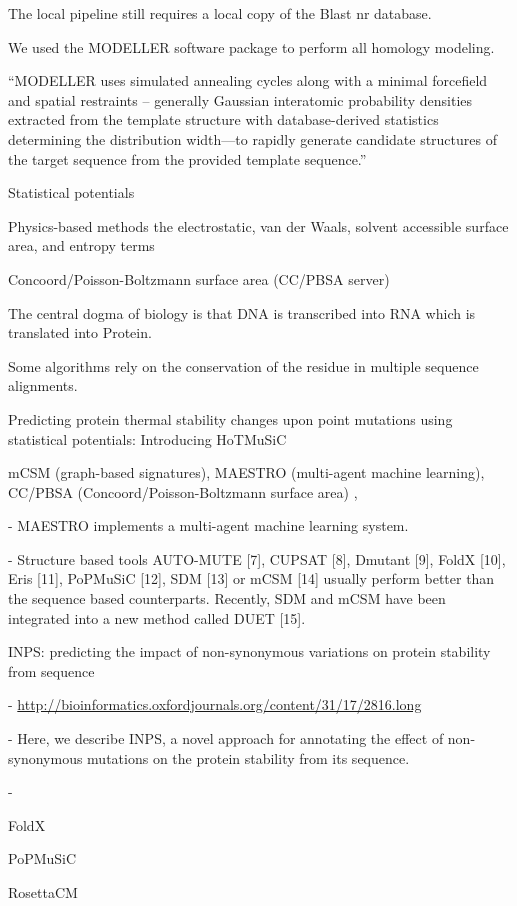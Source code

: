 The local pipeline still requires a local copy of the Blast nr database.

We used the MODELLER software package to perform all homology modeling.

``MODELLER uses simulated annealing cycles along with a minimal forcefield and spatial restraints -- generally Gaussian interatomic probability densities extracted from the template structure with database-derived statistics determining the distribution width—to rapidly generate candidate structures of the target sequence from the provided template sequence.''


Statistical potentials

Physics-based methods
the electrostatic, van der Waals, solvent accessible surface area, and entropy terms

Concoord/Poisson-Boltzmann surface area (CC/PBSA server)

The central dogma of biology is that DNA is transcribed into RNA which is translated into Protein.


Some algorithms rely on the conservation of the residue in multiple sequence alignments.

Predicting protein thermal stability changes upon point mutations using statistical potentials: Introducing HoTMuSiC


mCSM  (graph-based signatures), MAESTRO  (multi-agent machine learning), CC/PBSA (Concoord/Poisson-Boltzmann surface area) ,

  - MAESTRO implements a multi-agent machine learning system.

  - Structure based tools AUTO-MUTE [7], CUPSAT [8], Dmutant [9], FoldX [10], Eris [11], PoPMuSiC [12], SDM [13] or mCSM [14] usually perform better than the sequence based counterparts. Recently, SDM and mCSM have been integrated into a new method called DUET [15].

INPS: predicting the impact of non-synonymous variations on protein stability from sequence

  - \url{http://bioinformatics.oxfordjournals.org/content/31/17/2816.long}

  - Here, we describe INPS, a novel approach for annotating the effect of non-synonymous mutations on the protein stability from its sequence.

  - \cite{fariselli_inps:_2015}

FoldX

PoPMuSiC

RosettaCM

